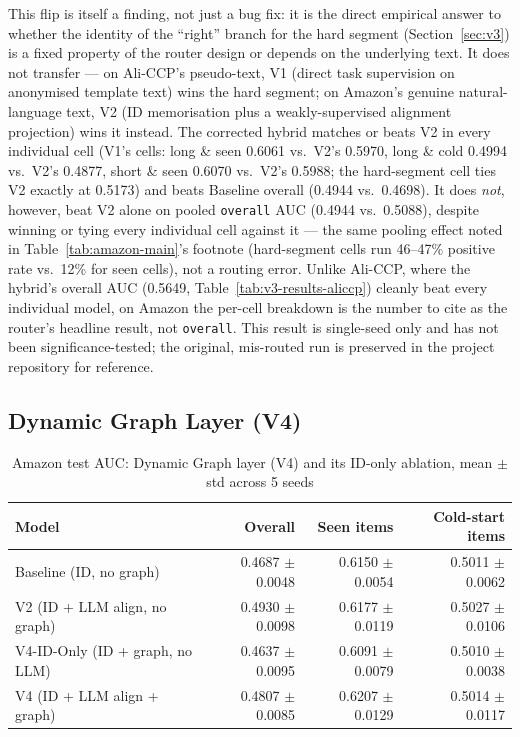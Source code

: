 This flip is itself a finding, not just a bug fix: it is the direct empirical answer to whether the identity of the ``right'' branch for the hard segment (Section~\ref{sec:v3}) is a fixed property of the router design or depends on the underlying text. It does not transfer --- on Ali-CCP's pseudo-text, V1 (direct task supervision on anonymised template text) wins the hard segment; on Amazon's genuine natural-language text, V2 (ID memorisation plus a weakly-supervised alignment projection) wins it instead. The corrected hybrid matches or beats V2 in every individual cell (V1's cells: long \& seen 0.6061 vs.\ V2's 0.5970, long \& cold 0.4994 vs.\ V2's 0.4877, short \& seen 0.6070 vs.\ V2's 0.5988; the hard-segment cell ties V2 exactly at 0.5173) and beats Baseline overall (0.4944 vs.\ 0.4698). It does \emph{not}, however, beat V2 alone on pooled \texttt{overall} AUC (0.4944 vs.\ 0.5088), despite winning or tying every individual cell against it --- the same pooling effect noted in Table~\ref{tab:amazon-main}'s footnote (hard-segment cells run 46--47\% positive rate vs.\ 12\% for seen cells), not a routing error. Unlike Ali-CCP, where the hybrid's overall AUC (0.5649, Table~\ref{tab:v3-results-aliccp}) cleanly beat every individual model, on Amazon the per-cell breakdown is the number to cite as the router's headline result, not \texttt{overall}. This result is single-seed only and has not been significance-tested; the original, mis-routed run is preserved in the project repository for reference.

\subsection{Dynamic Graph Layer (V4)}
\label{sec:results-v4}

\begin{table}[h]
\centering
\caption{Amazon test AUC: Dynamic Graph layer (V4) and its ID-only ablation, mean $\pm$ std across 5 seeds}
\label{tab:v4-results}
\begin{tabular}{lrrr}
\toprule
Model & Overall & Seen items & Cold-start items \\
\midrule
Baseline (ID, no graph)              & 0.4687 $\pm$ 0.0048 & 0.6150 $\pm$ 0.0054 & 0.5011 $\pm$ 0.0062 \\
V2 (ID + LLM align, no graph)        & 0.4930 $\pm$ 0.0098 & 0.6177 $\pm$ 0.0119 & 0.5027 $\pm$ 0.0106 \\
V4-ID-Only (ID + graph, no LLM)      & 0.4637 $\pm$ 0.0095 & 0.6091 $\pm$ 0.0079 & 0.5010 $\pm$ 0.0038 \\
V4 (ID + LLM align + graph)          & 0.4807 $\pm$ 0.0085 & 0.6207 $\pm$ 0.0129 & 0.5014 $\pm$ 0.0117 \\
\bottomrule
\end{tabular}
\end{table}

